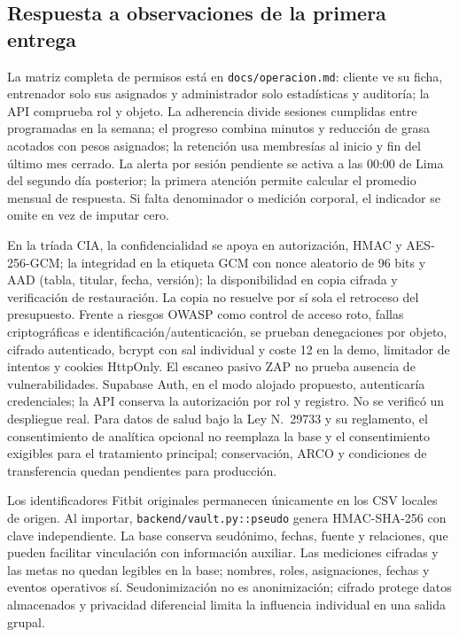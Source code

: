 \documentclass[11pt]{article}
\begin{document}
\subsection*{Respuesta a observaciones de la primera entrega}
La matriz completa de permisos está en \texttt{docs/operacion.md}: cliente ve su ficha, entrenador solo sus asignados y administrador solo estadísticas y auditoría; la API comprueba rol y objeto. La adherencia divide sesiones cumplidas entre programadas en la semana; el progreso combina minutos y reducción de grasa acotados con pesos asignados; la retención usa membresías al inicio y fin del último mes cerrado. La alerta por sesión pendiente se activa a las 00:00 de Lima del segundo día posterior; la primera atención permite calcular el promedio mensual de respuesta. Si falta denominador o medición corporal, el indicador se omite en vez de imputar cero.

En la tríada CIA, la confidencialidad se apoya en autorización, HMAC y AES-256-GCM; la integridad en la etiqueta GCM con nonce aleatorio de 96 bits y AAD (tabla, titular, fecha, versión); la disponibilidad en copia cifrada y verificación de restauración. La copia no resuelve por sí sola el retroceso del presupuesto. Frente a riesgos OWASP como control de acceso roto, fallas criptográficas e identificación/autenticación, se prueban denegaciones por objeto, cifrado autenticado, bcrypt con sal individual y coste 12 en la demo, limitador de intentos y cookies HttpOnly. El escaneo pasivo ZAP no prueba ausencia de vulnerabilidades. Supabase Auth, en el modo alojado propuesto, autenticaría credenciales; la API conserva la autorización por rol y registro. No se verificó un despliegue real. Para datos de salud bajo la Ley N.\textdegree{}~29733 y su reglamento, el consentimiento de analítica opcional no reemplaza la base y el consentimiento exigibles para el tratamiento principal; conservación, ARCO y condiciones de transferencia quedan pendientes para producción.

Los identificadores Fitbit originales permanecen únicamente en los CSV locales de origen. Al importar, \texttt{backend/vault.py::pseudo} genera HMAC-SHA-256 con clave independiente. La base conserva seudónimo, fechas, fuente y relaciones, que pueden facilitar vinculación con información auxiliar. Las mediciones cifradas y las metas no quedan legibles en la base; nombres, roles, asignaciones, fechas y eventos operativos sí. Seudonimización no es anonimización; cifrado protege datos almacenados y privacidad diferencial limita la influencia individual en una salida grupal.
\end{document}
